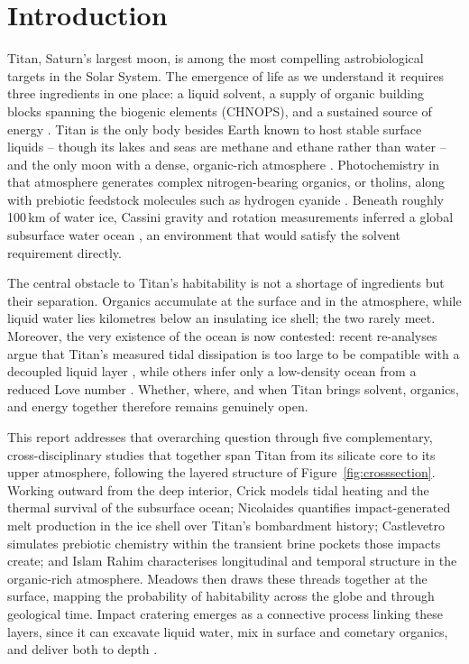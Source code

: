 \section{Introduction}

Titan, Saturn's largest moon, is among the most compelling astrobiological targets in the Solar
System. The emergence of life as we understand it requires three ingredients in one place: a liquid
solvent, a supply of organic building blocks spanning the biogenic elements (CHNOPS), and a sustained
source of energy \citep{Maruyama2019}. Titan is the only body besides Earth known to host stable
surface liquids -- though its lakes and seas are methane and ethane rather than water -- and the only
moon with a dense, organic-rich atmosphere \citep{Sohl2014}. Photochemistry in that atmosphere
generates complex nitrogen-bearing organics, or tholins, along with prebiotic feedstock molecules such
as hydrogen cyanide \citep{Raulin2008}. Beneath roughly 100\,km of water ice, Cassini gravity and
rotation measurements inferred a global subsurface water ocean \citep{Iess2012, Durante2019}, an
environment that would satisfy the solvent requirement directly.

The central obstacle to Titan's habitability is not a shortage of ingredients but their separation.
Organics accumulate at the surface and in the atmosphere, while liquid water lies kilometres below an
insulating ice shell; the two rarely meet. Moreover, the very existence of the ocean is now contested:
recent re-analyses argue that Titan's measured tidal dissipation is too large to be compatible with a
decoupled liquid layer \citep{Petricca2025}, while others infer only a low-density ocean from a
reduced Love number \citep{Goossens2024}. Whether, where, and when Titan brings solvent, organics, and
energy together therefore remains genuinely open.

This report addresses that overarching question through five complementary, cross-disciplinary studies
that together span Titan from its silicate core to its upper atmosphere, following the layered
structure of Figure~\ref{fig:crosssection}. Working outward from the deep interior, Crick
\citep{Crick2026} models tidal heating and the thermal survival of the subsurface ocean; Nicolaides
\citep{Nicolaides2026} quantifies impact-generated melt production in the ice shell over Titan's
bombardment history; Castlevetro \citep{Castlevetro2026} simulates prebiotic chemistry within the
transient brine pockets those impacts create; and Islam Rahim \citep{IslamRahim2026} characterises
longitudinal and temporal structure in the organic-rich atmosphere. Meadows \citep{Meadows2026} then
draws these threads together at the surface, mapping the probability of habitability across the globe
and through geological time. Impact cratering emerges as a connective process linking these layers,
since it can excavate liquid water, mix in surface and cometary organics, and deliver both to depth
\citep{Thompson1992, Neish2024}.

